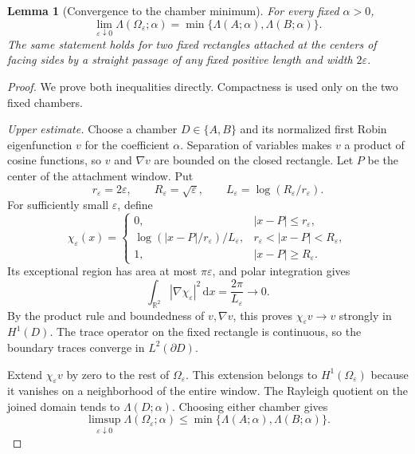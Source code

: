 \documentclass[11pt,a4paper]{article}
\newtheorem{lemma}[theorem]{Lemma}
\theoremstyle{definition}\newtheorem{definition}[theorem]{Definition}
\theoremstyle{remark}\newtheorem{remark}[theorem]{Remark}
\newcommand{\dd}{\,\mathrm d}
\begin{document}
\begin{lemma}[Convergence to the chamber minimum]\label{lem:neck}
For every fixed $\alpha>0$,
\begin{equation}\label{eq:neck-limit}
 \lim_{\varepsilon\downarrow0}\Lambda(\Omega_\varepsilon;\alpha)
 =\min\{\Lambda(A;\alpha),\Lambda(B;\alpha)\}.
\end{equation}
The same statement holds for two fixed rectangles attached at
the centers of facing sides by a straight passage of any fixed
positive length and width $2\varepsilon$.
\end{lemma}

\begin{proof}
We prove both inequalities directly. Compactness is used only
on the two fixed chambers.

\emph{Upper estimate.}
Choose a chamber $D\in\{A,B\}$ and its normalized first Robin
eigenfunction $v$ for the coefficient $\alpha$. Separation of
variables makes $v$ a product of cosine functions, so $v$ and
$\nabla v$ are bounded on the closed rectangle. Let $P$ be the
center of the attachment window. Put
\[
 r_\varepsilon=2\varepsilon,\qquad R_\varepsilon=\sqrt\varepsilon,
 \qquad L_\varepsilon=\log(R_\varepsilon/r_\varepsilon).
\]
For sufficiently small $\varepsilon$, define
\[
 \chi_\varepsilon(x)=
 \begin{cases}
 0,&|x-P|\le r_\varepsilon,\\
 \log(|x-P|/r_\varepsilon)/L_\varepsilon,
       &r_\varepsilon<|x-P|<R_\varepsilon,\\
 1,&|x-P|\ge R_\varepsilon.
 \end{cases}
\]
Its exceptional region has area at most $\pi\varepsilon$, and
polar integration gives
\begin{equation}\label{eq:capacity}
 \int_{\mathbb R^2}|\nabla\chi_\varepsilon|^2\dd x
 =\frac{2\pi}{L_\varepsilon}\longrightarrow0.
\end{equation}
By the product rule and boundedness of $v,\nabla v$, this proves
$\chi_\varepsilon v\to v$ strongly in $H^1(D)$. The trace
operator on the fixed rectangle is continuous, so the boundary
traces converge in $L^2(\partial D)$.

Extend $\chi_\varepsilon v$ by zero to the rest of
$\Omega_\varepsilon$. This extension belongs to
$H^1(\Omega_\varepsilon)$ because it vanishes on a neighborhood
of the entire window. The Rayleigh quotient on the joined
domain tends to $\Lambda(D;\alpha)$. Choosing either chamber
gives
\begin{equation}\label{eq:limsup}
 \limsup_{\varepsilon\downarrow0}\Lambda(\Omega_\varepsilon;\alpha)
 \le\min\{\Lambda(A;\alpha),\Lambda(B;\alpha)\}.
\end{equation}


\end{proof}
\end{document}
